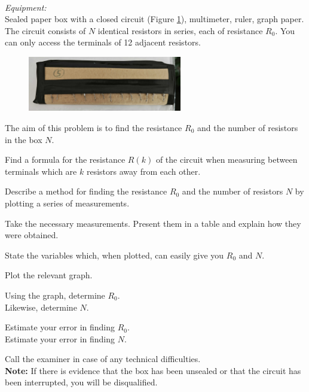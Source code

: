 \documentclass[../TST.tex]{subfiles}
\begin{document}
\begin{eproblem}{\ \\[5pt]}
\textit{Equipment:}\\
Sealed paper box with a closed circuit (Figure \ref{fig2}), multimeter, ruler, graph paper. The circuit consists of $N$ identical resistors in series, each of resistance $R_0$. You can only access the terminals of 12 adjacent resistors.
\begin{figure}[h]
		\centering
\includegraphics[width=0.6\textwidth]{fig/2010_e1.jpg}
    \caption{}
	\label{fig2}
\end{figure}

The aim of this problem is to find the resistance $R_0$ and the number of resistors in the box $N$.
\begin{subpart}
	\item Find a formula for the resistance $R(k)$ of the circuit when measuring between terminals which are $k$ resistors away from each other.
	\item Describe a method for finding the resistance $R_0$ and the number of resistors $N$ by plotting a series of measurements.
	\item Take the necessary measurements. Present them in a table and explain how they were obtained. 
	\item State the variables which, when plotted, can easily give you $R_0$ and $N$. 
	\item Plot the relevant graph. 
	\item Using the graph, determine $R_0$. \\
		Likewise, determine $N$. 
	\item Estimate your error in finding $R_0$. \\
		Estimate your error in finding $N$. 
\end{subpart}
Call the examiner in case of any technical difficulties.\\

\textbf{Note:} If there is evidence that the box has been unsealed or that the circuit has been interrupted, you will be disqualified.  
\end{eproblem}
\end{document}
